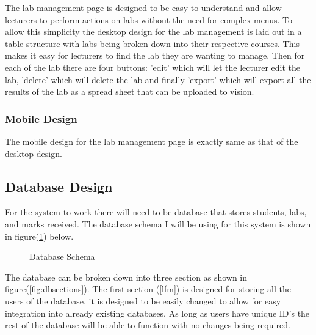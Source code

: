 \documentclass[12pt]{article}  %
\begin{document}
The lab management page is designed to be easy to understand and allow lecturers to perform actions on labs without the need for complex menus. To allow this simplicity the desktop design for the lab management is laid out in a table structure with labs being broken down into their respective courses. This makes it easy for lecturers to find the lab they are wanting to manage. Then for each of the lab there are four buttons: 'edit' which will let the lecturer edit the lab, 'delete' which will delete the lab and finally 'export' which will export all the results of the lab as a spread sheet that can be uploaded to vision.

\subsubsection*{Mobile Design}

The mobile design for the lab management page is exactly same as that of the desktop design.



\newpage
\subsection{Database Design}
\label{sec:design-db}
For the system to work there will need to be database that stores students, labs, and marks received. The database schema I will be using for this system is shown in figure(\ref{fig:dbschema}) below.

\begin{figure}[H]
	\caption{Database Schema}
	\label{fig:dbschema}
\end{figure}

\noindent The database can be broken down into three section as shown in figure(\ref{fig:dbsections}). The first section ([lfm]) is designed for storing all the users of the database, it is designed to be easily changed to allow for easy integration into already existing databases. As long as users have unique ID's the rest of the database will be able to function with no changes being required.
\end{document}

